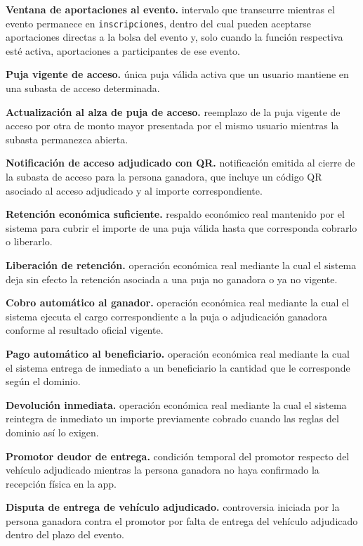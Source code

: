 \documentclass[10pt,letterpaper]{article}
\begin{document}
\noindent\textbf{Ventana de aportaciones al evento.} intervalo que transcurre mientras el evento permanece en \texttt{inscripciones}, dentro del cual pueden aceptarse aportaciones directas a la bolsa del evento y, solo cuando la función respectiva esté activa, aportaciones a participantes de ese evento.\par
\noindent\textbf{Puja vigente de acceso.} única puja válida activa que un usuario mantiene en una subasta de acceso determinada.\par
\noindent\textbf{Actualización al alza de puja de acceso.} reemplazo de la puja vigente de acceso por otra de monto mayor presentada por el mismo usuario mientras la subasta permanezca abierta.\par
\noindent\textbf{Notificación de acceso adjudicado con QR.} notificación emitida al cierre de la subasta de acceso para la persona ganadora, que incluye un código QR asociado al acceso adjudicado y al importe correspondiente.\par
\noindent\textbf{Retención económica suficiente.} respaldo económico real mantenido por el sistema para cubrir el importe de una puja válida hasta que corresponda cobrarlo o liberarlo.\par
\noindent\textbf{Liberación de retención.} operación económica real mediante la cual el sistema deja sin efecto la retención asociada a una puja no ganadora o ya no vigente.\par
\noindent\textbf{Cobro automático al ganador.} operación económica real mediante la cual el sistema ejecuta el cargo correspondiente a la puja o adjudicación ganadora conforme al resultado oficial vigente.\par
\noindent\textbf{Pago automático al beneficiario.} operación económica real mediante la cual el sistema entrega de inmediato a un beneficiario la cantidad que le corresponde según el dominio.\par
\noindent\textbf{Devolución inmediata.} operación económica real mediante la cual el sistema reintegra de inmediato un importe previamente cobrado cuando las reglas del dominio así lo exigen.\par
\noindent\textbf{Promotor deudor de entrega.} condición temporal del promotor respecto del vehículo adjudicado mientras la persona ganadora no haya confirmado la recepción física en la app.\par
\noindent\textbf{Disputa de entrega de vehículo adjudicado.} controversia iniciada por la persona ganadora contra el promotor por falta de entrega del vehículo adjudicado dentro del plazo del evento.\par
\end{document}

